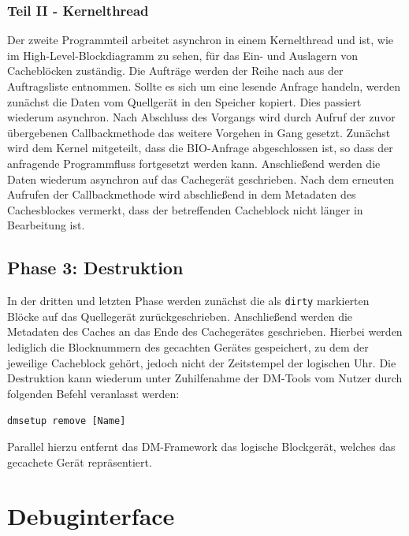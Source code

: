 \subsubsection{Teil II - Kernelthread}

Der zweite Programmteil arbeitet asynchron in einem Kernelthread und ist, wie im High-Level-Blockdiagramm zu sehen, für das Ein- und Auslagern von Cacheblöcken
zuständig. Die Aufträge werden der Reihe nach aus der Auftragsliste entnommen. Sollte es sich um eine lesende Anfrage handeln, werden zunächst die Daten vom
Quellgerät in den Speicher kopiert. Dies passiert wiederum asynchron. Nach Abschluss des Vorgangs wird durch Aufruf der zuvor übergebenen Callbackmethode das
weitere Vorgehen in Gang gesetzt. Zunächst wird dem Kernel mitgeteilt, dass die \ac{BIO}-Anfrage abgeschlossen ist, so dass der anfragende Programmfluss
fortgesetzt werden kann. Anschließend werden die Daten wiederum asynchron auf das Cachegerät geschrieben. Nach dem erneuten Aufrufen der Callbackmethode wird abschließend in
dem Metadaten des Cachesblockes vermerkt, dass der betreffenden Cacheblock nicht länger in Bearbeitung ist.

\subsection{Phase 3: Destruktion}

In der dritten und letzten Phase werden zunächst die als \texttt{dirty} markierten Blöcke auf das Quellegerät zurückgeschrieben. Anschließend werden die
Metadaten des Caches an das Ende des Cachegerätes geschrieben. Hierbei werden lediglich die Blocknummern des gecachten Gerätes gespeichert, zu dem der jeweilige
Cacheblock gehört, jedoch nicht der Zeitstempel der logischen Uhr. Die Destruktion kann wiederum unter Zuhilfenahme der \ac{DM}-Tools vom Nutzer durch folgenden
Befehl veranlasst werden:

\begin{flushleft}
\hspace{0.25cm} \small \texttt{dmsetup remove [Name]}
\end{flushleft}

Parallel hierzu entfernt das \ac{DM}-Framework das logische Blockgerät, welches das gecachete Gerät repräsentiert.

\section{Debuginterface}
\label{chap6:debug}

